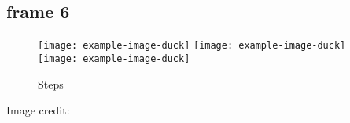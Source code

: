\documentclass[xcolor={table,dvipsnames,usenames}]{beamer}
\begin{document}
\nobibliography{\jobname}
\subsection{frame 6}
\begin{frame}{}
\begin{figure}
\texttt{[image: example-image-duck]}\hfill
\texttt{[image: example-image-duck]}
\vfill
\texttt{[image: example-image-duck]}
\caption{Steps}
\end{figure}
\vfill
\footnotesize Image credit: 
\end{frame}
\end{document}
